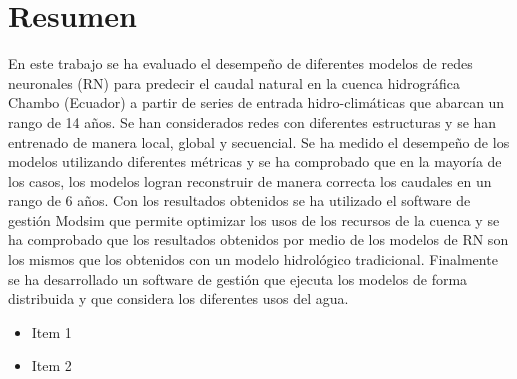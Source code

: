 \setcounter{page}{1}
\chapter*{Resumen}

En este trabajo se ha evaluado el desempeño de diferentes modelos de redes neuronales (RN)
para predecir el caudal natural en la cuenca hidrográfica Chambo (Ecuador) a partir de series de
entrada hidro-climáticas que abarcan un rango de 14 años. Se han considerados redes con
diferentes estructuras y se han entrenado de manera local, global y secuencial. Se ha medido el
desempeño de los modelos utilizando diferentes métricas y se ha comprobado que en la
mayoría de los casos, los modelos logran reconstruir de manera correcta los caudales en un
rango de 6 años. Con los resultados obtenidos se ha utilizado el software de gestión Modsim
que permite optimizar los usos de los recursos de la cuenca y se ha comprobado que los
resultados obtenidos por medio de los modelos de RN son los mismos que los obtenidos con un
modelo hidrológico tradicional. Finalmente se ha desarrollado un software de gestión que
ejecuta los modelos de forma distribuida y que considera los diferentes usos del agua.


\begin{itemize}
\item Item 1
\item Item 2
\end{itemize}